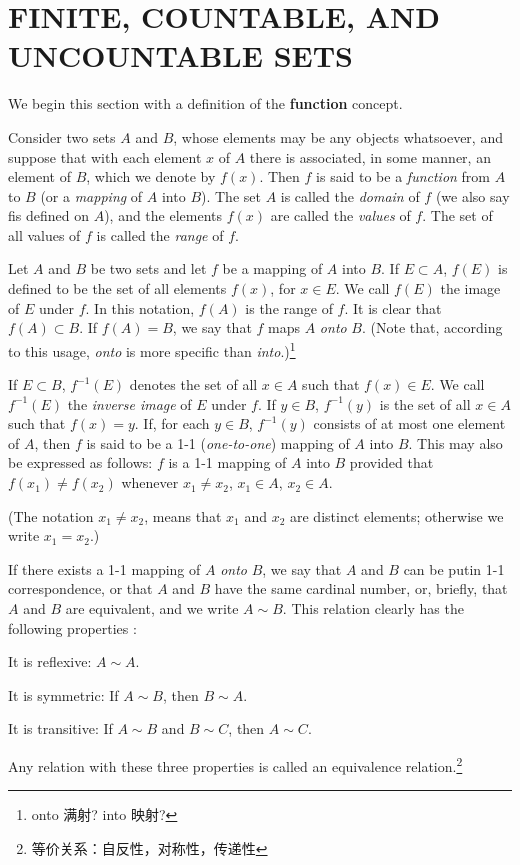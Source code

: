 \section{FINITE, COUNTABLE, AND UNCOUNTABLE SETS}

We begin this section with a definition of the \textbf{function} concept.
\begin{myDefinition}\label{myDefinition:2.1function}
Consider two sets $A$ and $B$, whose elements may be any objects whatsoever, and suppose that with each element $x$ of $A$ there is associated, in some manner, an element of $B$, which we denote by $f(x)$. Then $f$ is said to be a \emph{function} from $A$ to $B$ (or a \emph{mapping} of $A$ into $B$). The set $A$ is called the \emph{domain} of $f$ (we also say fis defined on $A$), and the elements $f(x)$ are called the \emph{values} of $f$. The set of all values of $f$ is called the \emph{range} of $f$.
\end{myDefinition}

\begin{myDefinition}\label{myDefinition:2.2onto_onetoone}
Let $A$ and $B$ be two sets and let $f$ be a mapping of $A$ into $B$.
If $E \subset A$, $f(E)$ is defined to be the set of all elements $f(x)$, for $x \in E$. We call $f(E)$ the image of $E$ under $f$. In this notation, $f(A)$ is the range of $f$. It is clear that $f(A) \subset B$. If $f(A) = B$, we say that $f$ maps $A$ \emph{onto} $B$. (Note that, according
to this usage, \emph{onto} is more specific than \emph{into}.)\footnote{onto 满射? into 映射?} 

If $E \subset B$, $f^{-1}(E)$ denotes the set of all $x \in A$ such that $f(x)\in E$. We call $f^{-1}(E)$ the \emph{inverse image} of $E$ under $f$. If $y \in B$, $f^{-1}(y)$ is the set of all $x \in A$ such that $f(x) =y$. If, for each $y\in B$, $f^{-1}(y)$ consists of at most one element of $A$, then $f$ is said to be a 1-1 (\emph{one-to-one}) mapping of $A$ into $B$. This may also be expressed as follows: $f$ is a 1-1 mapping of $A$ into $B$ provided that $f(x_1) \neq f(x_2)$ whenever $x_1 \neq x_2$, $x_1 \in A$, $x_2 \in A$.

(The notation $x_1 \neq x_2$, means that $x_1$ and $x_2$ are distinct elements; otherwise we write $x_1 = x_2$.)
\end{myDefinition}

\begin{myDefinition}\label{myDefinition:2.3equivalent}
If there exists a 1-1 mapping of $A$ \emph{onto} $B$, we say that $A$ and $B$ can be putin 1-1 correspondence, or that $A$ and $B$ have the same cardinal number, or, briefly, that $A$ and $B$ are equivalent, and we write $A\sim B$. This relation
clearly has the following properties :

It is reflexive: $A\sim A$.

It is symmetric: If $A\sim B$, then $B\sim A$.

It is transitive: If $A\sim B$ and $B\sim C$, then $A\sim C$.

Any relation with these three properties is called an equivalence relation.\footnote{等价关系：自反性，对称性，传递性}
\end{myDefinition}

